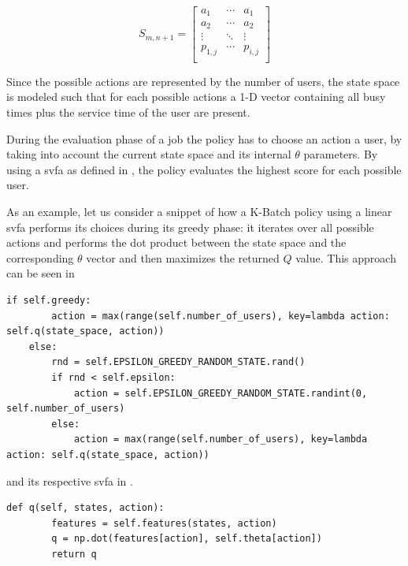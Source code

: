 \begin{equation}
\label{eq:kbatch_sp}
	S_{m,n+1} = 
	\begin{bmatrix}
	a_1 & \cdots & a_1 \\
	a_2 & \cdots & a_2 \\
	\vdots & \ddots & \vdots \\
	p_{1,j} & \cdots & p_{i,j} \\
	\end{bmatrix}
\end{equation}

Since the possible actions are represented by the number of users, the state space is modeled such that for each possible actions a 1-D vector containing all busy times plus the service time of the user are present.

During the evaluation phase of a job the policy has to choose an action \ie a user, by taking into account the current state space and its internal $\theta$ parameters. By using a \gls{svfa} as defined in , the policy evaluates the highest score for each possible user.

As an example, let us consider a snippet of how a K-Batch policy using a linear \gls{svfa} performs its choices during its greedy phase: it iterates over all possible actions and performs the dot product between the state space and the corresponding $\theta$ vector and then maximizes the returned $Q$ value. This approach can be seen in  

\begin{lstlisting}[caption=\glsentrylong{ep} approach,label=lst:e_greedy,style=CustomPython]
    if self.greedy:
        action = max(range(self.number_of_users), key=lambda action: self.q(state_space, action))
    else:
        rnd = self.EPSILON_GREEDY_RANDOM_STATE.rand()
        if rnd < self.epsilon:
            action = self.EPSILON_GREEDY_RANDOM_STATE.randint(0, self.number_of_users)
        else:
            action = max(range(self.number_of_users), key=lambda action: self.q(state_space, action))
\end{lstlisting}

and its respective \gls{svfa} in .

\begin{lstlisting}[caption=\glsentryshort{svfa},label=lst:value_f_approx,style=CustomPython]
    def q(self, states, action):
        features = self.features(states, action)
        q = np.dot(features[action], self.theta[action])
        return q
\end{lstlisting}
 
